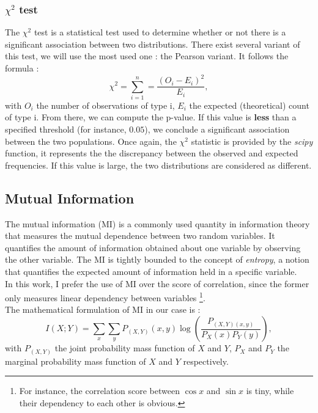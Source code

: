 \subsubsection*{$\chi^2$ test}

The $\chi^2$ test is a statistical test used to determine whether or not there is a significant association between two distributions. There exist several variant of this test, we will use the most used one : the Pearson variant. It follows the formula : 
\begin{equation}
    \chi^2 = \sum_{i=1}^n = \frac{(O_i - E_i)^2}{E_i},
\end{equation}
with $O_i$ the number of observations of type i, $E_i$ the expected (theoretical) count of type i.
From there, we can compute the p-value. If this value is \textbf{less} than a specified threshold (for instance, $0.05$), we conclude a significant association between the two populations. Once again, the $\chi^2$ statistic is provided by the \textit{scipy} function, it represents the the discrepancy between the observed and expected frequencies. If this value is large, the two distributions are considered as different.

\subsection{Mutual Information}

The mutual information (MI) is a commonly used quantity in information theory that measures the mutual dependence between two random variables. It quantifies the amount of information obtained about one variable by observing the other variable. The MI is tightly bounded to the concept of \textit{entropy}, a notion that quantifies the expected amount of information held in a specific variable.\\
In this work, I prefer the use of MI over the score of correlation, since the former only measures linear dependency between variables \footnote{For instance, the correlation score between $\cos{x}$ and $\sin{x}$ is tiny, while their dependency to each other is obvious.}.\\
The mathematical formulation of MI in our case is :
\begin{equation}
    I(X;Y) = \sum_x \sum_y P_{(X,Y)} (x,y) \log \left( \frac{P_{(X,Y)(x,y)}}{P_X(x) P_Y(y)} \right),
\end{equation}
with $ P_{(X,Y)}$ the joint probability mass function of $X$ and $Y$, $P_X$ and $P_Y$ the marginal probability mass function of $X$ and $Y$ respectively.\\